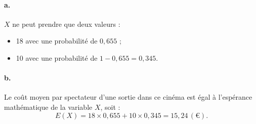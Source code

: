 \paragraph{a.} \( X \) ne peut prendre que deux valeurs :

\begin{itemize}
  \item 18 avec une probabilité de \(0{,}655\) ;
  \item 10 avec une probabilité de \( 1 - 0{,}655 = 0{,}345 \).
\end{itemize}

\paragraph{b.} Le coût moyen par spectateur d'une sortie dans ce cinéma est égal à l'espérance mathématique de la variable \( X \), soit :
\[
E(X) = 18 \times 0{,}655 + 10 \times 0{,}345 = 15{,}24 \, (\text{€}).
\]
